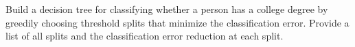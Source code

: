 \item {} Build a decision tree for classifying whether a person has a college degree by greedily choosing threshold splits that minimize the classification error. Provide a list of all splits and the classification error reduction at each split.